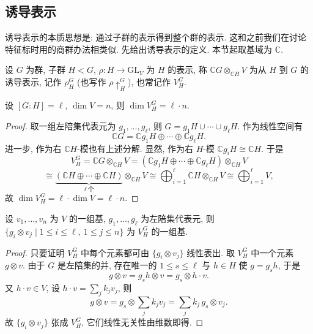 \subsection{诱导表示}

诱导表示的本质思想是: 通过子群的表示得到整个群的表示.
这和之前我们在讨论特征标时用的商群办法相类似. 先给出诱导表示的定义.
本节起取基域为 $\mathbb{C}$.

\begin{definition}[诱导表示]\label{def:induced-rep}
设 $G$ 为群, 子群 $H<G$, $\rho\colon H\to\mathrm{GL}_V$ 为 $H$ 的表示,
称 $\mathbb{C}G\otimes_{\mathbb{C}H}V$ 为从 $H$ 到 $G$ 的诱导表示,
记作 $\rho_H^G$ (也写作 $\rho\uparrow_H^G$), 也常记作 $V_H^G$.
\end{definition}

\begin{lemma}\label{lem:induced-dim}
设 $[G:H]=\ell$, $\dim V=n$, 则 $\dim V_H^G=\ell\cdot n$.
\end{lemma}

\begin{proof}
取一组左陪集代表元为 $g_1,\dots,g_\ell$, 则 $G=g_1H\cup\cdots\cup g_\ell H$.
作为线性空间有
\[
  \mathbb{C}G=\mathbb{C}g_1H\oplus\cdots\oplus\mathbb{C}g_\ell H .
\]
进一步, 作为右 $\mathbb{C}H$-模也有上述分解. 显然, 作为右 $H$-模
$\mathbb{C}g_iH\cong\mathbb{C}H$. 于是
\[
  V_H^G=\mathbb{C}G\otimes_{\mathbb{C}H}V
  =(\mathbb{C}g_1H\oplus\cdots\oplus\mathbb{C}g_\ell H)\otimes_{\mathbb{C}H}V
\]
\[
  \cong\underbrace{(\mathbb{C}H\oplus\cdots\oplus\mathbb{C}H)}_{\ell\ \text{个}}\otimes_{\mathbb{C}H}V
  \cong\bigoplus_{i=1}^{\ell}\mathbb{C}H\otimes_{\mathbb{C}H}V\cong\bigoplus_{i=1}^{\ell}V,
\]
故 $\dim V_H^G=\ell\cdot\dim V=\ell\cdot n$.
\end{proof}

\begin{lemma}\label{lem:induced-basis}
设 $v_1,\dots,v_n$ 为 $V$ 的一组基, $g_1,\dots,g_\ell$ 为左陪集代表元, 则
$\{g_i\otimes v_j\mid 1\le i\le\ell,\ 1\le j\le n\}$ 为 $V_H^G$ 的一组基.
\end{lemma}

\begin{proof}
只要证明 $V_H^G$ 中每个元素都可由 $\{g_i\otimes v_j\}$ 线性表出.
取 $V_H^G$ 中一个元素 $g\otimes v$. 由于 $G$ 是左陪集的并, 存在唯一的 $1\le s\le\ell$ 与
$h\in H$ 使 $g=g_sh$, 于是
\[
  g\otimes v=g_sh\otimes v=g_s\otimes h\cdot v .
\]
又 $h\cdot v\in V$, 设 $h\cdot v=\sum_j k_jv_j$, 则
\[
  g\otimes v=g_s\otimes\sum_j k_jv_j=\sum_j k_j\,g_s\otimes v_j .
\]
故 $\{g_i\otimes v_j\}$ 张成 $V_H^G$, 它们线性无关性由维数即得.
\end{proof}

